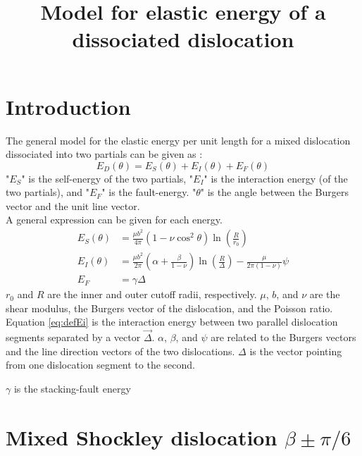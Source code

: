 \documentclass[10pt,a4paper,draft]{article}
\title{Model for elastic energy of a dissociated dislocation}
\begin{document}
\section{Introduction}

The general model for the elastic energy per unit length for a mixed dislocation dissociated into two partials can be given as \cite{bacon78}:
\begin{equation}
E_D(\theta) = E_S(\theta) + E_I(\theta) + E_F(\theta) \label{eqbacon}
\end{equation}
"$E_S$" is the self-energy of the two partials, "$E_I$" is the interaction energy (of the two partials), and "$E_F$" is the fault-energy. "$\theta$" is the angle between the Burgers vector and the unit line vector.\\

A general expression can be given for each energy.
\begin{subequations}
\begin{align}
E_S(\theta) & = \frac{\mu b^2}{4\pi}\left(1-\nu\cos^2\theta\right)\ln\left(\frac{R}{r_0}\right) \label{eq:defEs}\\
E_I(\theta) & = \frac{\mu b^2}{2\pi}\left(\alpha+\frac{\beta}{1-\nu}\right)\ln\left(\frac{R}{\Delta}\right)-\frac{\mu}{2\pi(1-\nu)}\psi \label{eq:defEi}\\
E_F & = \gamma \Delta \label{eq:defEf}
\end{align}
\end{subequations}
$r_0$ and $R$ are the inner and outer cutoff radii, respectively. $\mu$, $b$, and $\nu$ are the shear modulus, the Burgers vector of the dislocation, and the Poisson ratio.\\

Equation \ref{eq:defEi} is the interaction energy between two parallel dislocation segments separated by a vector $\vec{\Delta}$. $\alpha$, $\beta$, and $\psi$ are related to the Burgers vectors and the line direction vectors of the two dislocations. $\Delta$ is the vector pointing from one dislocation segment to the second.

$\gamma$ is the stacking-fault energy

\section{Mixed Shockley dislocation $\beta \pm \pi/6$}



\end{document}
